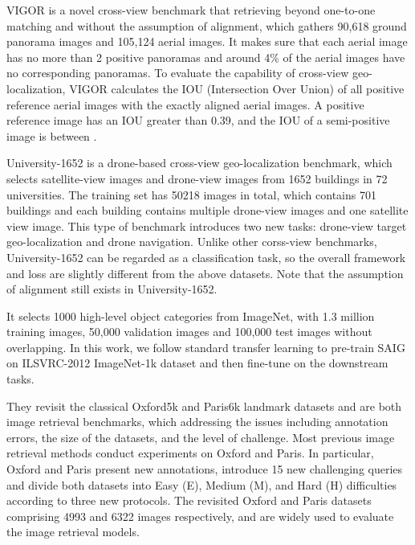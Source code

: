 \documentclass[sn-basic,iicol]{sn-jnl}
\theoremstyle{thmstyletwo}\newtheorem{example}{Example}\newtheorem{remark}{Remark}
\theoremstyle{thmstylethree}\newtheorem{definition}{Definition}
\begin{document}
 VIGOR is a novel cross-view benchmark that retrieving beyond one-to-one matching and without the assumption of alignment, which gathers 90,618 ground panorama images and 105,124 aerial images. It makes sure that each aerial image has no more than 2 positive panoramas and around 4\% of the aerial images have no corresponding panoramas. To evaluate the capability of cross-view geo-localization, VIGOR calculates the IOU (Intersection Over Union) of all positive reference aerial images with the exactly aligned aerial images. A positive reference image has an IOU greater than 0.39, and the IOU of a semi-positive image is between .




 University-1652 is a drone-based cross-view geo-localization benchmark, which selects satellite-view images and drone-view images from 1652 buildings in 72 universities. The training set has 50218 images in total, which contains 701 buildings and each building contains multiple drone-view images and one satellite view image. This type of benchmark introduces two new tasks: drone-view target geo-localization and drone navigation. Unlike other corss-view benchmarks, University-1652 can be regarded as a classification task, so the overall framework and loss are slightly different from the above datasets. Note that the assumption of alignment still exists in University-1652.

 It selects 1000 high-level object categories from ImageNet, with 1.3 million training images, 50,000 validation images and 100,000 test images without overlapping. In this work, we follow standard transfer learning to pre-train SAIG on ILSVRC-2012 ImageNet-1k dataset and then fine-tune on the downstream tasks.

They revisit the classical Oxford5k and Paris6k landmark datasets and are both image retrieval benchmarks, which addressing the issues including annotation errors, the size of the datasets, and the level of challenge. Most previous image retrieval methods conduct experiments on Oxford and Paris. In particular, Oxford and Paris present new annotations, introduce 15 new challenging queries and divide both datasets into Easy (E), Medium (M), and Hard (H) difficulties according to three new protocols. The revisited Oxford and Paris datasets comprising 4993 and 6322 images respectively, and are widely used to evaluate the image retrieval models.
\end{document}

